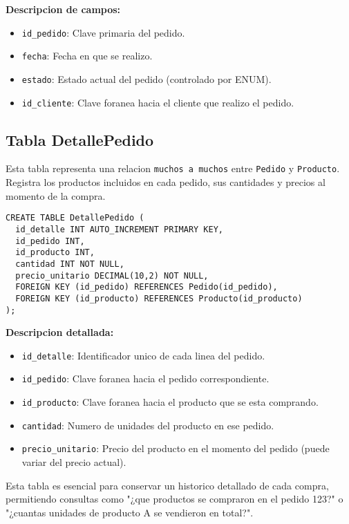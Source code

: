 \textbf{Descripcion de campos:}

\begin{itemize}
  \item \texttt{id\_pedido}: Clave primaria del pedido.
  \item \texttt{fecha}: Fecha en que se realizo.
  \item \texttt{estado}: Estado actual del pedido (controlado por ENUM).
  \item \texttt{id\_cliente}: Clave foranea hacia el cliente que realizo el pedido.
\end{itemize}

\subsection{Tabla DetallePedido}

Esta tabla representa una relacion \texttt{muchos a muchos} entre \texttt{Pedido} y \texttt{Producto}. Registra los productos incluidos en cada pedido, sus cantidades y precios al momento de la compra.

\begin{lstlisting}
CREATE TABLE DetallePedido (
  id_detalle INT AUTO_INCREMENT PRIMARY KEY,
  id_pedido INT,
  id_producto INT,
  cantidad INT NOT NULL,
  precio_unitario DECIMAL(10,2) NOT NULL,
  FOREIGN KEY (id_pedido) REFERENCES Pedido(id_pedido),
  FOREIGN KEY (id_producto) REFERENCES Producto(id_producto)
);
\end{lstlisting}

\textbf{Descripcion detallada:}

\begin{itemize}
  \item \texttt{id\_detalle}: Identificador unico de cada linea del pedido.
  \item \texttt{id\_pedido}: Clave foranea hacia el pedido correspondiente.
  \item \texttt{id\_producto}: Clave foranea hacia el producto que se esta comprando.
  \item \texttt{cantidad}: Numero de unidades del producto en ese pedido.
  \item \texttt{precio\_unitario}: Precio del producto en el momento del pedido (puede variar del precio actual).
\end{itemize}

Esta tabla es esencial para conservar un historico detallado de cada compra, permitiendo consultas como "¿que productos se compraron en el pedido 123?" o "¿cuantas unidades de producto A se vendieron en total?".

